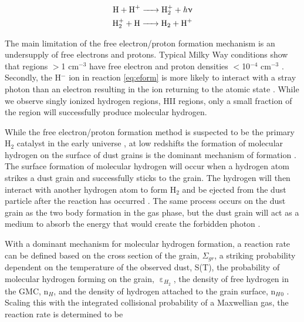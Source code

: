 \begin{equation}\label{eq:pform}
  \begin{split}
    \ce{H + H^+ -> H^+_2 + \it{h\nu}} \\
    \ce{H^+_2 + H -> H_2 + H^+}
  \end{split}
\end{equation}

The main limitation of the free electron/proton formation mechanism is an undersupply of free electrons and protons.  Typical Milky Way conditions show that regions $>$1 cm$^{-3}$ have free electron and proton densities $<$10$^{-4}$ cm$^{-3}$ \citep{wolfire2003}.  Secondly, the H$^-$ ion in reaction \ref{eq:eform} is more likely to interact with a stray photon than an electron resulting in the ion returning to the atomic state \citep{glover2003}.  While we observe singly ionized hydrogen regions, HII regions, only a small fraction of the region will successfully produce molecular hydrogen.

While the free electron/proton formation method is suspected to be the primary H$_2$ catalyst in the early universe \citep{herbst2005}, at low redshifts the formation of molecular hydrogen on the surface of dust grains is the dominant mechanism of formation \citep{krumholz2014}.  The surface formation of molecular hydrogen will occur when a hydrogen atom strikes a dust grain and successfully sticks to the grain.  The hydrogen will then interact with another hydrogen atom to form H$_2$ and be ejected from the dust particle after the reaction has occurred \citep{pirronello1997}.  The same process occurs on the dust grain as the two body formation in the gas phase, but  the dust grain will act as a medium to absorb the energy that would create the forbidden photon \citep{krumholz2014}.


With a dominant mechanism for molecular hydrogen formation, a reaction rate can be defined based on the cross section of the grain, $\Sigma_{gr}$, a striking probability dependent on the temperature of the observed dust, S(T), the probability of molecular hydrogen forming on the grain, $\upepsilon_{H_2}$, the density of free hydrogen in the GMC, n$_H$, and the density of hydrogen attached to the grain surface, n$_H{_0}$ \citep{krumholz2014}.  Scaling this with the integrated collisional probability of a Maxwellian gas, the reaction rate is determined to be

